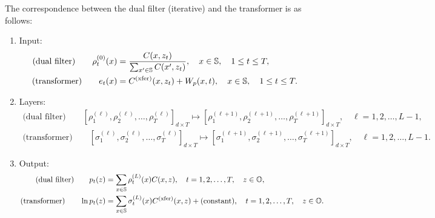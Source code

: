 \documentclass[twoside,11pt]{article}
\def\bS{\begin{slide}}
\def\bS{\mathbb{S}}
\def\bO{\mathbb{O}}
\def\xfer{{\text{\rm (xfer)}}}
\begin{document}
The correspondence between the dual filter (iterative) and the transformer is as follows:
\begin{enumerate}
\item Input:
  \begin{subequations}
 \begin{align*}
   \text{(dual filter)}\qquad \rho_t^{(0)}(x) &= \frac{C(x,z_t)}{\sum_{x'\in \bS} C(x',z_t)} ,\quad x\in\bS,
   \quad 1\leq t\leq T,
   \\
     \text{(transformer)}\qquad e_t(x) & =C^\xfer(x,z_t) +W_p(x,t) ,\quad x\in\bS,
   \quad 1\leq t\leq T.
 \end{align*}
\end{subequations}
\item Layers:
  \begin{subequations} \label{eq:layer_xfer_dual}
 \begin{align}
   \text{(dual filter)}\qquad
   [\rho_1^{(\ell)},\rho_2^{(\ell)},\hdots,\rho_T^{(\ell)}]_{d\times
   T}  \mapsto
   [\rho_1^{(\ell+1)},\rho_2^{(\ell+1)},\hdots,\rho_T^{(\ell+1)}]_{d\times
   T},\quad \ell=1,2,\hdots,L-1,
   \\
     \text{(transformer)}\qquad [\sigma_1^{(\ell)},\sigma_2^{(\ell)},\hdots,\sigma_T^{(\ell)}]_{d\times T}  \mapsto  [\sigma_1^{(\ell+1)},\sigma_2^{(\ell+1)},\hdots,\sigma_T^{(\ell+1)}]_{d\times T},\quad \ell=1,2,\hdots,L-1.
 \end{align}
 \end{subequations}
\item Output:
 \begin{subequations}\label{eq:p_T_formula}
 \begin{align*}
   \text{(dual filter)}\qquad p_t(z) &= \sum_{x\in\bS} \rho_t^{(L)}(x) C(x,z),\quad
                               t=1,2,\hdots,T, \quad
                                       z\in\bO, %
   \\
     \text{(transformer)}\qquad \ln p_t(z) &=  \sum_{x\in\bS} \sigma_t^{(L)}(x) C^\xfer(x,z) + \text{(constant)},\quad t=1,2,\hdots,T, \quad z\in\bO. %
 \end{align*}
\end{subequations}
\end{enumerate}
\end{document}
